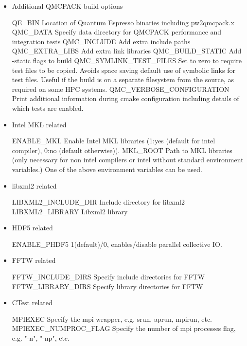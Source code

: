 \begin{itemize}
\item Additional QMCPACK build options

\begin{shade}
QE_BIN                 Location of Quantum Espresso binaries including pw2qmcpack.x
QMC_DATA               Specify data directory for QMCPACK performance and integration tests
QMC_INCLUDE            Add extra include paths
QMC_EXTRA_LIBS         Add extra link libraries
QMC_BUILD_STATIC       Add -static flags to build
QMC_SYMLINK_TEST_FILES Set to zero to require test files to be copied. Avoids space
                       saving default use of symbolic links for test files. Useful
                       if the build is on a separate filesystem from the source, as
                       required on some HPC systems.
QMC_VERBOSE_CONFIGURATION Print additional information during cmake configuration
                          including details of which tests are enabled.
\end{shade}

\item Intel MKL related
%
\begin{shade}
ENABLE_MKL          Enable Intel MKL libraries (1:yes (default for intel compiler),
                                                0:no (default otherwise)).
MKL_ROOT            Path to MKL libraries (only necessary for non intel compilers
                    or intel without standard environment variables.)
                    One of the above environment variables can be used.
\end{shade}

\item libxml2 related
%
\begin{shade}
LIBXML2_INCLUDE_DIR   Include directory for libxml2
LIBXML2_LIBRARY       Libxml2 library
\end{shade}

\item HDF5 related
%
\begin{shade}
ENABLE_PHDF5    1(default)/0, enables/disable parallel collective IO.
\end{shade}

\item FFTW related
%
\begin{shade}
FFTW_INCLUDE_DIRS   Specify include directories for FFTW
FFTW_LIBRARY_DIRS   Specify library directories for FFTW
\end{shade}

\item CTest related
%
\begin{shade}
MPIEXEC                Specify the mpi wrapper, e.g. srun, aprun, mpirun, etc.
MPIEXEC_NUMPROC_FLAG   Specify the number of mpi processes flag,
                       e.g. "-n", "-np", etc.
\end{shade}


\end{itemize}
